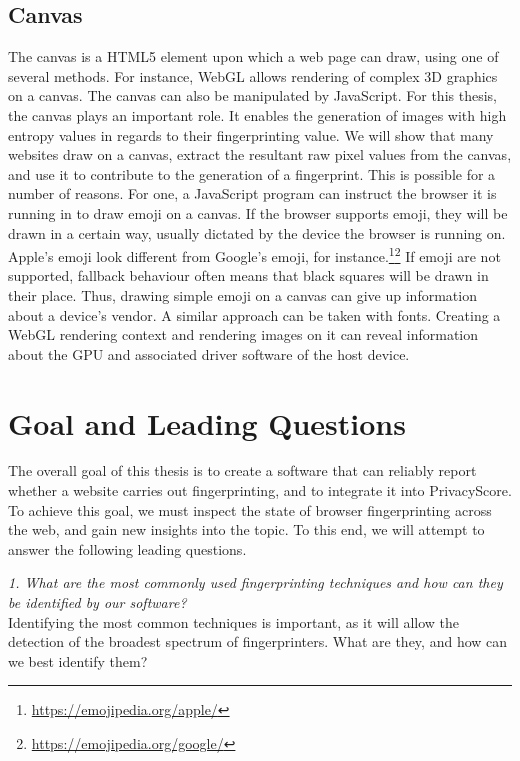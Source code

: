 \documentclass[
    fontsize=12pt,
    headings=small,
    parskip=half,
    bibliography=totoc,
    numbers=noenddot,
    open=any
    ]{scrreprt}
\begin{document}
\subsection{Canvas}
\label{fundamentals:canvas}
The canvas \cite{w3ccanvas} is a HTML5 element upon which a web page can draw,
using one of several methods. For instance, WebGL allows rendering of complex
3D graphics on a canvas.
The canvas can also be manipulated by JavaScript. For this thesis,
the canvas plays an important role. It enables the generation
of images with high entropy values in regards to their fingerprinting value.
We will show that many websites draw on a canvas, extract the resultant raw pixel
values from the canvas, and use it to contribute to the generation of a fingerprint.
This is possible for a number of reasons. For one, a JavaScript program
can instruct the browser it is running in to draw emoji on a canvas.
If the browser supports emoji, they will be drawn in a certain way, usually dictated
by the device the browser is running on. Apple's emoji look different from Google's
emoji, for instance.\footnote{\url{https://emojipedia.org/apple/}}\footnote{\url{https://emojipedia.org/google/}}
If emoji are not supported, fallback behaviour often means that black squares will
be drawn in their place.
Thus, drawing simple emoji on a canvas can give up information about a device's vendor.
A similar approach can be taken with fonts.
Creating a WebGL rendering context and rendering images on it can reveal
information about the GPU and associated driver software of the host device.


\section{Goal and Leading Questions}
\label{sec:goal}
The overall goal of this thesis is to create a software that can reliably report whether a website carries out
fingerprinting, and to integrate it into PrivacyScore. To achieve this goal,
we must inspect the state of browser fingerprinting across the web, and gain new insights into the topic.
To this end, we will attempt to answer the following leading questions.

\textit{1. What are the most commonly used fingerprinting techniques and how can they be identified by our software?}\\
Identifying the most common techniques is important, as it will allow the detection of the broadest spectrum
of fingerprinters. What are they, and how can we best identify them?
\end{document}
